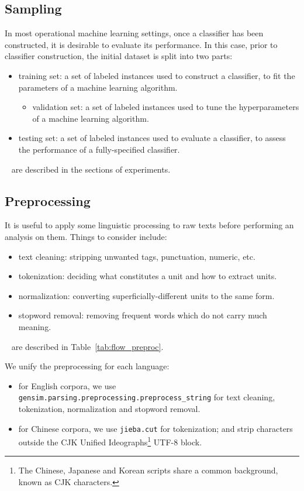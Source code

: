 \subsection{Sampling}
\par In most operational machine learning settings, once a classifier has been constructed, it is desirable to evaluate its performance. In this case, prior to classifier construction, the initial dataset is split into two parts\cite{sebastiani2002tc,ripley2007ml}:
\begin{itemize}
\item training set: a set of labeled instances used to construct a classifier, to fit the parameters of a machine learning algorithm.
	\begin{itemize}
	\item validation set: a set of labeled instances used to tune the hyperparameters of a machine learning algorithm.
	\end{itemize}
\item testing set: a set of labeled instances used to evaluate a classifier, to assess the performance of a fully-specified classifier.
\end{itemize}
~\newline
{} are described in the sections of experiments.

\subsection{Preprocessing}
\par It is useful to apply some linguistic processing to raw texts before performing an analysis on them. Things to consider include:
\begin{itemize}
\item text cleaning: stripping unwanted tags, punctuation, numeric, etc.
\item tokenization: deciding what constitutes a unit and how to extract units.
\item normalization: converting superficially-different units to the same form.
\item stopword removal: removing frequent words which do not carry much meaning.
\end{itemize}
~\newline
{} are described in Table~\ref{tab:flow_preproc}.
\par We unify the preprocessing for each language:
\begin{itemize}
\item for English corpora, we use \texttt{gensim.parsing.preprocessing.preprocess\_string} for text cleaning, tokenization, normalization and stopword removal.
\item for Chinese corpora, we use \texttt{jieba.cut} for tokenization; and strip characters outside the CJK Unified Ideographs\footnote{The Chinese, Japanese and Korean scripts share a common background, known as CJK characters.} UTF-8 block.
\end{itemize}


